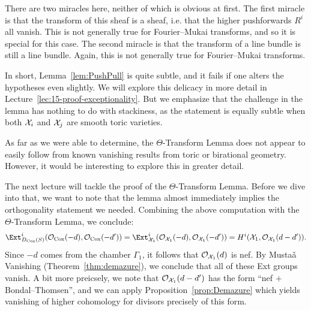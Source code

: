 \documentclass{amsart}
\begin{document}
There are two miracles here, neither of which is obvious at first.  The first miracle is that the transform of this sheaf is a sheaf, i.e. that the higher pushforwards $R^i$ all vanish.  This is not generally true for Fourier--Mukai transforms, and so it is special for this case.  The second miracle is that the transform of a line bundle is still a line bundle.  Again, this is not generally true for Fourier--Mukai transforms.

In short, Lemma~\ref{lem:PushPull} is quite subtle, and it fails if one alters the hypotheses even
slightly.  We will explore this delicacy in more detail in Lecture~\ref{lec:15-proof-exceptionality}.
But we emphasize that the challenge in the lemma has nothing to do with stackiness, as the statement is equally subtle when both $\mathcal X_i$ and $\mathcal X_j$ are smooth toric varieties.

\begin{remark}
\label{rem:simplify}
  As far as we were able to determine, the $\Theta$-Transform Lemma does not appear to easily follow from known vanishing results from toric or birational geometry.  However, it would be interesting to explore this in greater detail.  %
\end{remark}

The next lecture will tackle the proof of the $\Theta$-Transform Lemma.  Before we dive into that, we want to note that the lemma almost immediately implies the orthogonality statement we needed. Combining the above computation with the $\Theta$-Transform Lemma, we conclude:
\[
\Ext^i_{D_{\Cox}(S)}(\cO_{\Cox}(-d),\cO_{\Cox}(-d')) =
\Ext^i_{\sX_1}(\cO_{\sX_1}(-d),\cO_{\sX_1}(-d')) = H^i(\sX_1, \cO_{\sX_1}(d-d')).
\]
Since $-d$ comes from the chamber $\Gamma_1$, it follows that ${\mathcal O}_{\mathcal X_1}(d)$ is nef.  By Musta\v{a} Vanishing  (Theorem~\ref{thm:demazure}), we conclude that all of these Ext groups vanish. A bit more preicsely, we note that ${\mathcal O}_{\mathcal X_1}(d-d')$ has the form ``nef $+$ Bondal--Thomsen'', and we can apply Proposition~\ref{prop:Demazure} which yields vanishing of higher cohomology for divisors precisely of this form. 
\end{document}
